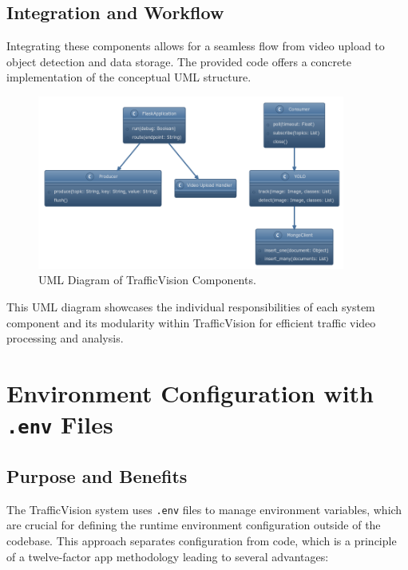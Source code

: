 \subsection{Integration and Workflow}

Integrating these components allows for a seamless flow from video upload to object detection and data storage. The provided code offers a concrete implementation of the conceptual UML structure.

\begin{figure}[H]
    \centering
    \includegraphics[width=0.9\textwidth]{images/uml.png}
    \caption{UML Diagram of TrafficVision Components.}
    \label{fig:umlDiagram}
\end{figure}

This UML diagram showcases the individual responsibilities of each system component and its modularity within TrafficVision for efficient traffic video processing and analysis.


\section{Environment Configuration with \texttt{.env} Files}

\subsection{Purpose and Benefits}

The TrafficVision system uses \texttt{.env}\cite{gentleIntroductionEnvFiles} files to manage environment variables, which are crucial for defining the runtime environment configuration outside of the codebase. This approach separates configuration from code, which is a principle of a twelve-factor app methodology\cite{twelveFactor} leading to several advantages:

